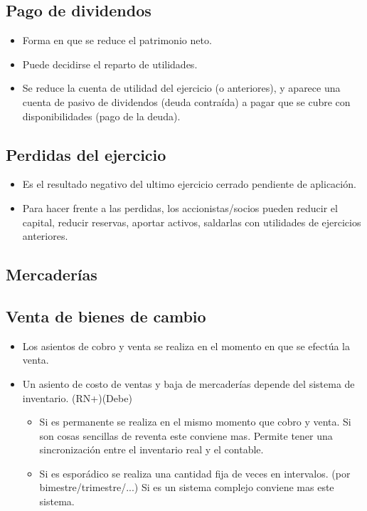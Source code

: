 \documentclass[titlepage,a4paper]{article}
\begin{document}
\subsection*{Pago de dividendos}
\begin{itemize}
\item Forma en que se reduce el patrimonio neto.
\item Puede decidirse el reparto de utilidades.
\item Se reduce la cuenta de utilidad del ejercicio (o anteriores), y aparece una cuenta de pasivo de dividendos (deuda contraída) a pagar que se cubre con disponibilidades (pago de la deuda).
\end{itemize}


\subsection*{Perdidas del ejercicio}
\begin{itemize}
\item Es el resultado negativo del ultimo ejercicio cerrado pendiente de aplicación.
\item Para hacer frente a las perdidas, los accionistas/socios pueden reducir el capital, reducir reservas, aportar activos, saldarlas con utilidades de ejercicios anteriores.
\end{itemize}
 

\subsection{Mercaderías}
\subsection*{Venta de bienes de cambio}
\begin{itemize}
\item Los asientos de cobro y venta se realiza en el momento en que se efectúa la venta.
\item Un asiento de costo de ventas y baja de mercaderías depende del sistema de inventario. (RN+)(Debe)
\begin{itemize}
\item Si es permanente se realiza en el mismo momento que cobro y venta. Si son cosas sencillas de reventa este conviene mas. Permite tener una sincronización entre el inventario real y el contable.
\item Si es esporádico se realiza una cantidad fija de veces en intervalos. (por bimestre/trimestre/...) Si es un sistema complejo conviene mas este sistema.
\end{itemize}
\end{itemize}
\end{document}
